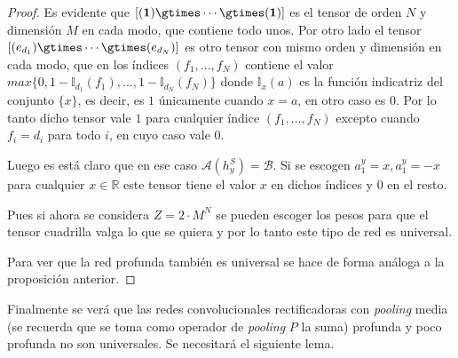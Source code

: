 \begin{proof}
Es evidente que $ \left[(\mathbf{1})\gtimes\cdots \gtimes(\mathbf{1}) \right]$ es el tensor de orden $N$ y dimensión $M$ en cada modo, que contiene todo unos. Por otro lado el tensor $\left[ (e_{d_1})\gtimes\cdots \gtimes(e_{d_N}) \right]$ es otro tensor con mismo orden y dimensión en cada modo, que en los índices $(f_1,... ,f_N)$ contiene el valor $max\{0,1-\mathbb{I}_{d_1}(f_1),... ,1-\mathbb{I}_{d_N}(f_N)\}$ donde $\mathbb{I}_{x}(a)$ es la función indicatriz del conjunto $\{x\}$, es decir, es $1$ únicamente cuando $x=a$, en otro caso es $0$. Por lo tanto dicho tensor vale $1$ para cualquier índice $(f_1,... ,f_N)$ excepto cuando $f_i = d_i$ para todo $i$, en cuyo caso vale $0$.

Luego es está claro que en ese caso $\mathcal{A}(h_y^S) = \mathcal{B}$. Si se escogen $a_1^y = x, a_1^y = -x$ para cualquier $x\in\mathbb{R}$ este tensor tiene el valor $x$ en dichos índices y $0$ en el resto.

Pues si ahora se considera $Z=2\cdot M^N$ se pueden escoger los pesos para que el tensor cuadrilla valga lo que se quiera y por lo tanto este tipo de red es universal.

Para ver que la red profunda también es universal se hace de forma análoga a la proposición anterior.
\end{proof}

Finalmente se verá que las redes convolucionales rectificadoras con \textit{pooling} media (se recuerda que se toma como operador de \textit{pooling} $P$ la suma) profunda y poco profunda no son universales. Se necesitará el siguiente lema.


